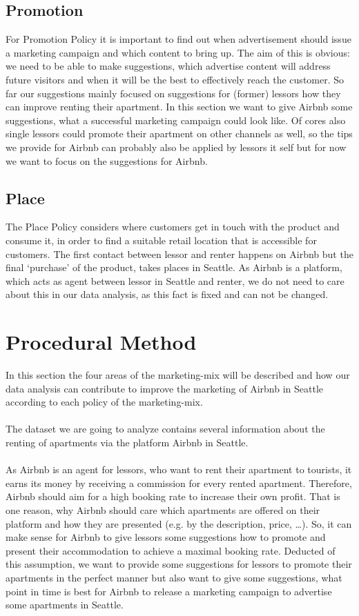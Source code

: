 \documentclass[journal]{IEEEtran}
\begin{document}
\subsection{Promotion}
\noindent For Promotion Policy it is important to find out when advertisement should issue a marketing campaign and which content to bring up. The aim of this is obvious: we need to be able to make suggestions, which advertise content will address future visitors and when it will be the best to effectively reach the customer. So far our suggestions mainly focused on suggestions for (former) lessors how they can improve renting their apartment. In this section we want to give Airbnb some suggestions, what a successful marketing campaign could look like. Of cores also single lessors could promote their apartment on other channels as well, so the tips we provide for Airbnb can probably also be applied by lessors it self but for now we want to focus on the suggestions for Airbnb.
\subsection{Place}
\noindent The Place Policy considers where customers get in touch with the product and consume it, in order to find a suitable retail location that is accessible for customers. The first contact between lessor and renter happens on Airbnb but the final ‘purchase’ of the product, takes places in Seattle. As Airbnb is a platform, which acts as agent between lessor in Seattle and renter, we do not need to care about this in our data analysis, as this fact is fixed and can not be changed.

\section{Procedural Method}
\noindent In this section the four areas of the marketing-mix will be described and how our data analysis can contribute to improve the marketing of Airbnb in Seattle according to each policy of the marketing-mix.\\\\\noindent The dataset we are going to analyze contains several information about the renting of apartments via the platform Airbnb in Seattle. \\\\ As Airbnb is an agent for lessors, who want to rent their apartment to tourists, it earns its money by receiving a commission for every rented apartment. Therefore, Airbnb should aim for a high booking rate to increase their own profit. That is one reason, why Airbnb should care which apartments are offered on their platform and how they are presented (e.g. by the description, price, …). So, it can make sense for Airbnb to give lessors some suggestions how to promote and present their accommodation to achieve a maximal booking rate. Deducted of this assumption, we want to provide some suggestions for lessors to promote their apartments in the perfect manner but also want to give some suggestions, what point in time is best for Airbnb to release a marketing campaign to advertise some apartments in Seattle. 
\end{document}
